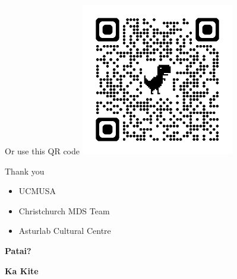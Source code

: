 \documentclass[
  ignorenonframetext,
  aspectratio=169,
]{beamer}
\providecommand{\tightlist}{%
  \setlength{\itemsep}{0pt}\setlength{\parskip}{0pt}}\usepackage{longtable,booktabs,array}
\begin{document}
\begin{frame}{Or use this QR code}
\label{or-use-this-qr-code}
\includegraphics[width=0.5\textwidth,height=\textheight]{figs/mds-qr.png}
\end{frame}

\begin{frame}{Thank you}
\label{thank-you}
\begin{itemize}
\tightlist
\item
  UCMUSA
\item
  Christchurch MDS Team
\item
  Asturlab Cultural Centre
\end{itemize}
\end{frame}

\begin{frame}
\textbf{Patai?}

\textbf{Ka Kite}
\end{frame}
\end{document}
